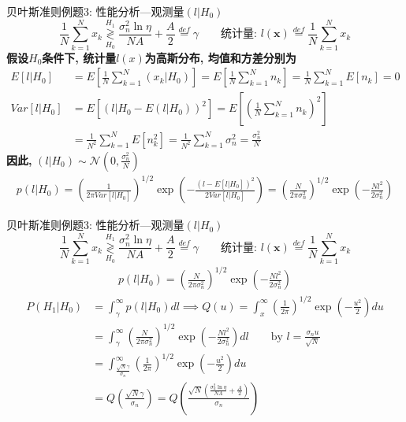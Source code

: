 \begin{frame}[shrink]{贝叶斯准则例题3: 性能分析---观测量$(l|H_0)$}
\[
\frac{1}{N}\sum\limits_{k=1}^{N}x_k\mathop{\gtrless}\limits_{H_0}^{H_1}\frac{\sigma_n^2\ln\eta}{NA}+\frac{A}{2}\mathop{=}\limits^{def}\gamma \qquad \textbf{统计量: }l(\bm{x})\mathop{=}\limits^{def}\frac{1}{N}\sum\limits_{k=1}^{N}x_k
\]
\textbf{假设$H_0$条件下, 统计量$l(x)$为高斯分布, 均值和方差分别为}
\begin{align*}
E[l|H_0]&=E\left[\frac{1}{N}\sum\limits_{k=1}^{N}(x_k|H_0)\right]=E\left[\frac{1}{N}\sum\limits_{k=1}^{N}n_k\right]=\frac{1}{N}\sum\limits_{k=1}^{N}E[n_k]=0\\
Var[l|H_0]&=E\left[(l|H_0-E(l|H_0))^2\right]=E\left[\left(\frac{1}{N}\sum\limits_{k=1}^{N}n_k\right)^2\right]\\
&=\frac{1}{N^2}\sum\limits_{k=1}^{N}E[n_k^2]=\frac{1}{N^2}\sum\limits_{k=1}^{N}\sigma_n^2=\frac{\sigma_n^2}{N}
\end{align*}
\textbf{因此, }$(l|H_0)\sim\mathcal{N}(0,\frac{\sigma_n^2}{N})$
\begin{align*}
p(l|H_0)=\left(\frac{1}{2\pi Var[l|H_0]}\right)^{1/2}\exp\left(-\frac{(l-E[l|H_0])^2}{2 Var[l|H_0]}\right)=\left(\frac{N}{2\pi\sigma_n^2}\right)^{1/2}\exp\left(-\frac{Nl^2}{2\sigma_n^2}\right)
\end{align*}
\end{frame}

\begin{frame}[shrink]{贝叶斯准则例题3: 性能分析---观测量$(l|H_0)$}
\[
\frac{1}{N}\sum\limits_{k=1}^{N}x_k\mathop{\gtrless}\limits_{H_0}^{H_1}\frac{\sigma_n^2\ln\eta}{NA}+\frac{A}{2}\mathop{=}\limits^{def}\gamma \qquad \textbf{统计量: }l(\bm{x})\mathop{=}\limits^{def}\frac{1}{N}\sum\limits_{k=1}^{N}x_k
\]
\begin{align*}
p(l|H_0)=\left(\frac{N}{2\pi\sigma_n^2}\right)^{1/2}\exp\left(-\frac{Nl^2}{2\sigma_n^2}\right)
\end{align*}
\begin{align*}
P(H_1|H_0)&=\int_{\gamma}^{\infty}p(l|H_0)dl\implies Q(u)=\int_{x}^{\infty}\left(\frac{1}{2\pi}\right)^{1/2}\exp\left(-\frac{u^2}{2}\right)du\\
&=\int_{\gamma}^{\infty}\left(\frac{N}{2\pi\sigma_n^2}\right)^{1/2}\exp\left(-\frac{Nl^2}{2\sigma_n^2}\right)dl\qquad \text{by } l=\frac{\sigma_nu}{\sqrt{N}}\\
&=\int_{\frac{\sqrt{N}\gamma}{\sigma_n}}^{\infty}\left(\frac{1}{2\pi}\right)^{1/2}\exp\left(-\frac{u^2}{2}\right)du\\
&=Q\left(\frac{\sqrt{N}\gamma}{\sigma_n}\right)=Q\left(\frac{\sqrt{N}\left(\frac{\sigma_n^2\ln\eta}{NA}+\frac{A}{2}\right)}{\sigma_n}\right)
\end{align*}
\end{frame}

